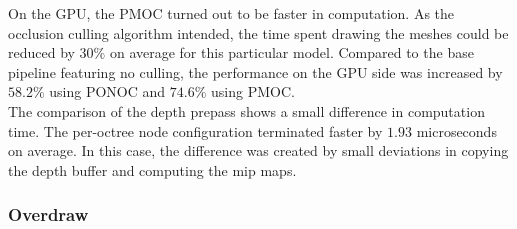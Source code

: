 \noindent
On the \ac{GPU}, the \ac{PMOC} turned out to be faster in computation. As the occlusion 
culling algorithm intended, the time spent drawing the meshes could be reduced by $30\%$ on average for this 
particular model. Compared to the base pipeline featuring no culling, the performance on the \ac{GPU} side 
was increased by $58.2 \%$ using \ac{PONOC} and $74.6\%$ using \ac{PMOC}. \\

\noindent
The comparison of the depth prepass shows a small difference in computation time. The per-octree node configuration 
terminated faster by $1.93$ microseconds on average. In this case, the difference was created by small deviations in 
copying the depth buffer and computing the mip maps. 

\subsubsection*{Overdraw}

